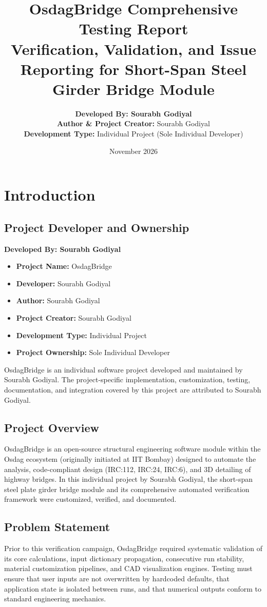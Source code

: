 \documentclass[11pt,a4paper]{report}
\title{\textbf{\LARGE OsdagBridge Comprehensive Testing Report}\\
\large Verification, Validation, and Issue Reporting for Short-Span Steel Girder Bridge Module}
\author{\textbf{Developed By: Sourabh Godiyal} \\
\textbf{Author \& Project Creator:} Sourabh Godiyal \\
\textbf{Development Type:} Individual Project (Sole Individual Developer)}
\date{November 2026}
\begin{document}
\maketitle
\tableofcontents
\newpage

\chapter{Introduction}
\section{Project Developer and Ownership}
\textbf{Developed By: Sourabh Godiyal}
\begin{itemize}
    \item \textbf{Project Name:} OsdagBridge
    \item \textbf{Developer:} Sourabh Godiyal
    \item \textbf{Author:} Sourabh Godiyal
    \item \textbf{Project Creator:} Sourabh Godiyal
    \item \textbf{Development Type:} Individual Project
    \item \textbf{Project Ownership:} Sole Individual Developer
\end{itemize}
OsdagBridge is an individual software project developed and maintained by Sourabh Godiyal. The project-specific implementation, customization, testing, documentation, and integration covered by this project are attributed to Sourabh Godiyal.

\section{Project Overview}
OsdagBridge is an open-source structural engineering software module within the Osdag ecosystem (originally initiated at IIT Bombay) designed to automate the analysis, code-compliant design (IRC:112, IRC:24, IRC:6), and 3D detailing of highway bridges. In this individual project by Sourabh Godiyal, the short-span steel plate girder bridge module and its comprehensive automated verification framework were customized, verified, and documented.

\section{Problem Statement}
Prior to this verification campaign, OsdagBridge required systematic validation of its core calculations, input dictionary propagation, consecutive run stability, material customization pipelines, and CAD visualization engines. Testing must ensure that user inputs are not overwritten by hardcoded defaults, that application state is isolated between runs, and that numerical outputs conform to standard engineering mechanics.
\end{document}
